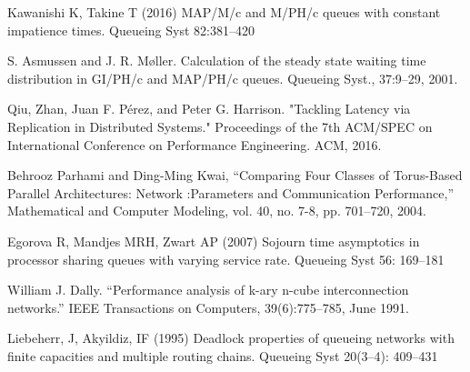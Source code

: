 \documentclass[letterpaper, 10 pt, conference]{ieeeconf}
\begin{document}
\begin{thebibliography}{99}
 Kawanishi K, Takine T (2016) MAP/M/c and M/PH/c queues with constant impatience times. Queueing Syst 82:381–420

 S. Asmussen and J. R. Møller. Calculation of the steady state waiting time distribution in GI/PH/c and MAP/PH/c queues. Queueing Syst., 37:9–29, 2001.

 Qiu, Zhan, Juan F. Pérez, and Peter G. Harrison. "Tackling Latency via Replication in Distributed Systems." Proceedings of the 7th ACM/SPEC on International Conference on Performance Engineering. ACM, 2016.

 Behrooz Parhami and Ding-Ming Kwai, “Comparing Four Classes of Torus-Based Parallel Architectures: Network :Parameters and Communication Performance,” Mathematical and Computer Modeling, vol. 40, no. 7-8, pp. 701–720, 2004.

 Egorova R, Mandjes MRH, Zwart AP (2007) Sojourn time asymptotics in processor sharing queues with varying service rate. Queueing Syst 56: 169–181

 William J. Dally. “Performance analysis of k-ary n-cube interconnection networks.” IEEE Transactions on Computers, 39(6):775–785, June 1991.

 Liebeherr, J, Akyildiz, IF (1995) Deadlock properties of queueing networks with finite capacities and multiple routing chains. Queueing Syst 20(3–4): 409–431

\end{thebibliography}
\end{document}
